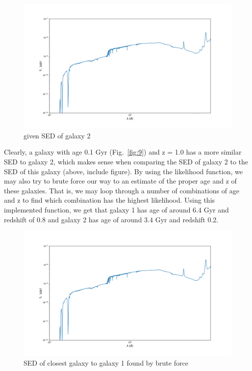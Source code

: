 \documentclass{article}
\begin{document}
\begin{figure}[H]
  \centering
\includegraphics[scale=0.25]{SED galaxy 2}
\caption{given SED of galaxy 2}
\end{figure}

Clearly, a galaxy with age 0.1 Gyr (Fig.~\ref{fig:9}) and z = 1.0 has a more similar SED to galaxy 2, which makes sense
when comparing the SED of galaxy 2 to the SED of this galaxy (above, include figure). By using the
likelihood function, we may also try to brute force our way to an estimate of the proper age and z
of these galaxies. That is, we may loop through a number of combinations of age and z to find which combination
has the highest likelihood. Using this implemented function, we get that galaxy 1 has age of around
6.4 Gyr and redshift of 0.8 and galaxy 2 has age of around 3.4 Gyr and redshift 0.2.


\begin{figure}[H]
  \centering
\includegraphics[scale=0.25]{SED closest galaxy 1}
\caption{SED of closest galaxy to galaxy 1 found by brute force}
\end{figure}
\end{document}
